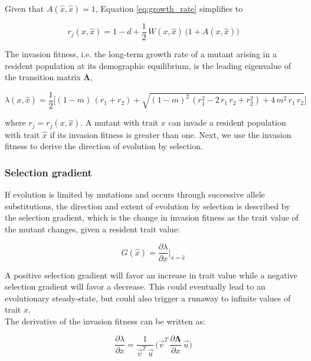 Given that $A(\hat{x}, \hat{x}) = 1$, Equation \ref{eq:growth_rate} simplifies to

\begin{equation}
    r_j(x, \hat{x}) = 1 - d + \frac{1}{2} \, W(x, \hat{x}) \, \big(1 + A(x, \hat{x})\big)
\end{equation}

The invasion fitness, i.e. the long-term growth rate of a mutant arising in a resident population at its demographic equilibrium, is the leading eigenvalue of the transition matrix $\pmb{\Lambda}$,

\begin{equation}
    \lambda(x, \hat{x}) = \frac{1}{2} \bigg[(1-m) \, (r_1 + r_2) + \sqrt{(1-m)^2 \, (r_1^2 - 2 \, r_1 \, r_2 + r_2^2) + 4 \, m^2 \, r_1 \, r_2} \bigg]
    \label{eq:invasion_fitness}
\end{equation}

where $r_j = r_j(x, \hat x)$. A mutant with trait $x$ can invade a resident population with trait $\hat x$ if its invasion fitness is greater than one. Next, we use the invasion fitness to derive the direction of evolution by selection.

\subsubsection*{Selection gradient}

If evolution is limited by mutations and occurs through successive allele substitutions, the direction and extent of evolution by selection is described by the selection gradient, which is the change in invasion fitness as the trait value of the mutant changes, given a resident trait value:

\begin{equation}
    G(\hat{x}) = \frac{\partial \lambda}{\partial x}\bigg|_{x=\hat{x}}
\end{equation}

A positive selection gradient will favor an increase in trait value while a negative selection gradient will favor a decrease. This could eventually lead to an evolutionary steady-state, but could also trigger a runaway to infinite values of trait $x$.\\

The derivative of the invasion fitness can be written as:

\begin{equation}
   \frac{\partial \lambda}{\partial x}\bigg = \frac{1}{\overrightarrow{v}^T\,\overrightarrow{u}} \, \bigg( \overrightarrow{v}^T \, \frac{\partial \pmb{\Lambda}}{\partial x} \, \overrightarrow{u} \bigg)
   \label{eq:deriv_fitness}
\end{equation}

